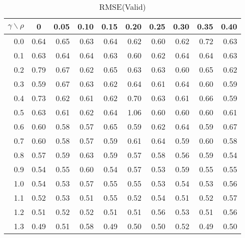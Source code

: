 \documentclass[12pt]{article}
\begin{document}
%

\begin{table}[!tbp]
\caption{RMSE(Valid)}
 \begin{center}
 \begin{tabular}{r|rrrrrrrrr}\hline\hline
\multicolumn{1}{c|}{$\gamma\backslash\rho$}&\multicolumn{1}{c}{0}&\multicolumn{1}{c}{0.05}&\multicolumn{1}{c}{0.10}&\multicolumn{1}{c}{0.15}&\multicolumn{1}{c}{0.20}&\multicolumn{1}{c}{0.25}&\multicolumn{1}{c}{0.30}&\multicolumn{1}{c}{0.35}&\multicolumn{1}{c}{0.40}\tabularnewline
\hline


0.0&0.64&0.65&0.63&0.64&0.62&0.60&0.62&0.72&0.63\tabularnewline
0.1&0.63&0.64&0.64&0.63&0.60&0.62&0.64&0.64&0.63\tabularnewline
0.2&0.79&0.67&0.62&0.65&0.63&0.63&0.60&0.65&0.62\tabularnewline
0.3&0.59&0.67&0.63&0.62&0.64&0.61&0.64&0.60&0.59\tabularnewline
0.4&0.73&0.62&0.61&0.62&0.70&0.63&0.61&0.66&0.59\tabularnewline
0.5&0.63&0.61&0.62&0.64&1.06&0.60&0.60&0.60&0.61\tabularnewline
0.6&0.60&0.58&0.57&0.65&0.59&0.62&0.64&0.59&0.67\tabularnewline
0.7&0.60&0.58&0.57&0.59&0.61&0.64&0.59&0.60&0.58\tabularnewline
0.8&0.57&0.59&0.63&0.59&0.57&0.58&0.56&0.59&0.54\tabularnewline
0.9&0.54&0.55&0.60&0.54&0.57&0.53&0.59&0.55&0.55\tabularnewline
1.0&0.54&0.53&0.57&0.55&0.55&0.53&0.54&0.53&0.56\tabularnewline
1.1&0.52&0.53&0.51&0.55&0.52&0.54&0.51&0.52&0.57\tabularnewline
1.2&0.51&0.52&0.52&0.51&0.51&0.56&0.53&0.51&0.56\tabularnewline
1.3&0.49&0.51&0.58&0.49&0.50&0.50&0.52&0.49&0.50\tabularnewline
\hline
\end{tabular}

\end{center}

\end{table}

%
\end{document}
